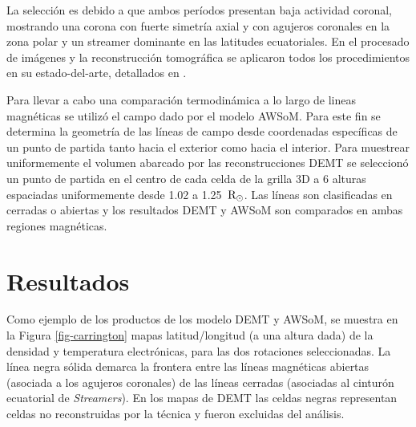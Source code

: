 \documentclass[baaa]{baaa}
\begin{document}
La selección es debido a que ambos períodos presentan baja actividad coronal, mostrando una corona con fuerte simetría axial y con agujeros coronales en la zona polar y un streamer dominante en las latitudes ecuatoriales. En el procesado de imágenes y la reconstrucción tomográfica se aplicaron todos los procedimientos en su estado-del-arte, detallados en \citet{lloveras_ba2017}.


Para llevar a cabo una comparación termodinámica a lo largo de lineas magnéticas se utilizó el campo dado por el modelo AWSoM. Para este fin se determina la geometría de las líneas de campo desde coordenadas específicas de un punto de partida tanto hacia el exterior como hacia el interior. Para muestrear uniformemente el volumen abarcado por las reconstrucciones DEMT se seleccionó un punto de partida en el centro de cada celda de la grilla 3D a 6 alturas espaciadas uniformemente desde 1.02 a 1.25 $\,{\rm R_\odot}$. Las líneas son clasificadas en cerradas o abiertas y los resultados DEMT y AWSoM son comparados en ambas regiones magnéticas.





\section{Resultados}
Como ejemplo de los productos de los modelo DEMT y AWSoM, se muestra en la Figura \ref{fig-carrington} mapas latitud/longitud (a una altura dada) de la densidad y temperatura electrónicas, para las dos rotaciones seleccionadas. La línea negra sólida demarca la frontera entre las líneas magnéticas abiertas (asociada a los agujeros coronales) de las líneas cerradas (asociadas al cinturón ecuatorial de \emph{Streamers}). En los mapas de DEMT las celdas negras representan celdas no reconstruidas por la técnica y fueron excluidas del análisis.
\end{document}
